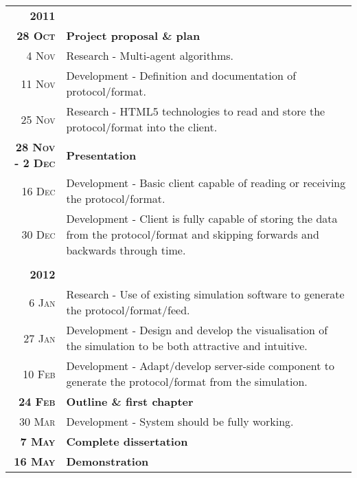 \documentclass[a4paper]{article}
\begin{document}
			\begin{tabular}{r p{11cm}}

				\textbf{2011}\\
				\textbf{28 \textsc{Oct}}						& \textbf{Project proposal \& plan} \\
				4 \textsc{Nov}									& Research - Multi-agent algorithms. \\
				11 \textsc{Nov}									& Development - Definition and documentation of protocol/format. \\
				25 \textsc{Nov}									& Research - HTML5 technologies to read and store the protocol/format into the client. \\
				\textbf{28 \textsc{Nov} - 2 \textsc{Dec}}		& \textbf{Presentation} \\
				16 \textsc{Dec}									& Development - Basic client capable of reading or receiving the protocol/format. \\
				30 \textsc{Dec}									& Development - Client is fully capable of storing the data from the protocol/format and skipping forwards and backwards through time. \\

				\\

				\textbf{2012}\\
				6 \textsc{Jan}									& Research - Use of existing simulation software to generate the protocol/format/feed. \\
				27 \textsc{Jan}									& Development - Design and develop the visualisation of the simulation to be both attractive and intuitive. \\
				10 \textsc{Feb}									& Development - Adapt/develop server-side component to generate the protocol/format from the simulation. \\
				\textbf{24 \textsc{Feb}}						& \textbf{Outline \& first chapter} \\
				30 \textsc{Mar}									& Development - System should be fully working. \\
				\textbf{7 \textsc{May}}							& \textbf{Complete dissertation} \\
				\textbf{16 \textsc{May}}						& \textbf{Demonstration} \\

			\end{tabular}
\end{document}
